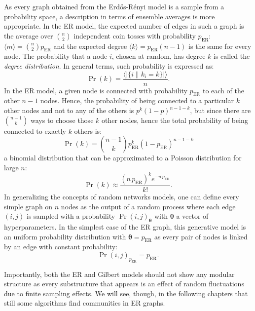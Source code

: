 As every graph obtained from the Erd\H{o}s-Rényi model is a sample from a probability space, a description in terms of ensemble averages is more appropriate.
In the ER model, the expected number of edges in such a graph is the average over $\binom{n}{2}$ independent coin tosses with probability $p_{\textrm{ER}}$: $\langle  m  \rangle = \binom{n}{2}p_{\textrm{ER}}$ and the expected degree $\langle  k \rangle = p_{\textrm{ER}}(n-1)$ is the same for every node.
The probability that a node $i$, chosen at random, has degree $k$ is called the \emph{degree distribution}.
In general terms, such probability is expressed as:
\begin{equation}
\Pr(k) = \frac{\langle  |\{ i \| k_i=k \}| \rangle }{n}.
\end{equation}
In the ER model, a given node is connected with probability $p_{\textrm{ER}}$ to each of the other $n-1$ nodes.
Hence, the probability of being connected to a particular $k$ other nodes and not to any of the others is $p^k(1-p)^{n-1-k}$, but since there are $\binom{n-1}{k}$ ways to choose those $k$ other nodes, hence the total probability of being connected to exactly $k$ others is:
\begin{equation}
\Pr(k) = \binom{n-1}{k}p_{\textrm{ER}}^k(1-p_{\textrm{ER}})^{n-1-k}
\end{equation}
a binomial distribution that can be approximated to a Poisson distribution for large $n$:
\begin{equation}
\Pr(k) \approx \frac{(n \, p_{\textrm{ER}})^k e^{-n \, p_{\textrm{ER}}} }{k!}.
\end{equation}
\bigbreak
In generalizing the concepts of random networks models, one can define every simple graph on $n$ nodes as the output of a random process where each edge $(i,j) $ is sampled with a probability $\Pr(i,j)_{ \boldsymbol \theta}$ with $\boldsymbol \theta$ a vector of hyperparameters.
In the simplest case of the ER graph, this generative model is an uniform probability distribution with $\boldsymbol \theta=p_{\textrm{ER}}$ as every pair of nodes is linked by an edge with constant probability:
\begin{equation}
\Pr({i,j})_{p_{\textrm{ER}}} = p_{\textrm{ER}}.
\end{equation}

Importantly, both the ER and Gilbert models should not show any modular structure as every substructure that appears is an effect of random fluctuations due to finite sampling effects.
We will see, though, in the following chapters that still some algorithms find communities in ER graphs.

